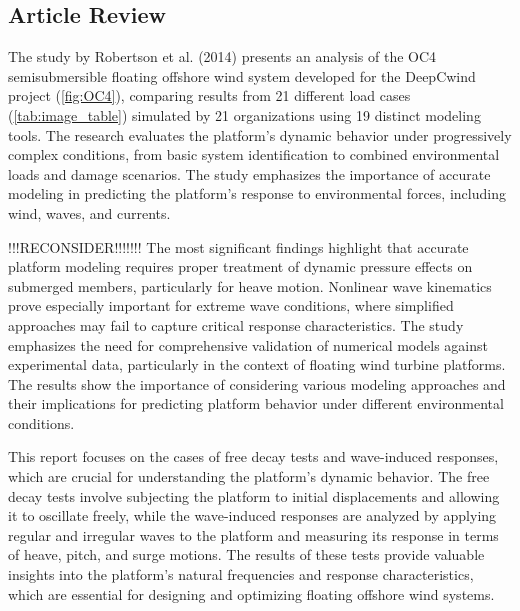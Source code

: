 \documentclass[a4paper]{article}
\begin{document}
\subsection{Article Review}
\hspace*{0.5cm}The study by Robertson et al. (2014) presents an analysis of the OC4 semisubmersible floating offshore wind system developed for the DeepCwind project (\autoref{fig:OC4}), comparing results from 21 different load cases (\autoref{tab:image_table}) simulated by 21 organizations using 19 distinct modeling tools. The research evaluates the platform’s dynamic behavior under progressively complex conditions, from basic system identification to combined environmental loads and damage scenarios. The study emphasizes the importance of accurate modeling in predicting the platform's response to environmental forces, including wind, waves, and currents. 

!!!RECONSIDER!!!!!!!
The most significant findings highlight that accurate platform modeling requires proper treatment of dynamic pressure effects on submerged members, particularly for heave motion. Nonlinear wave kinematics prove especially important for extreme wave conditions, where simplified approaches may fail to capture critical response characteristics. 
The study emphasizes the need for comprehensive validation of numerical models against experimental data, particularly in the context of floating wind turbine platforms. The results show the importance of considering various modeling approaches and their implications for predicting platform behavior under different environmental conditions.

This report focuses on the cases of free decay tests and wave-induced responses, which are crucial for understanding the platform's dynamic behavior. The free decay tests involve subjecting the platform to initial displacements and allowing it to oscillate freely, while the wave-induced responses are analyzed by applying regular and irregular waves to the platform and measuring its response in terms of heave, pitch, and surge motions.
The results of these tests provide valuable insights into the platform's natural frequencies and response characteristics, which are essential for designing and optimizing floating offshore wind systems.
\vspace{0.5cm}
\end{document}
